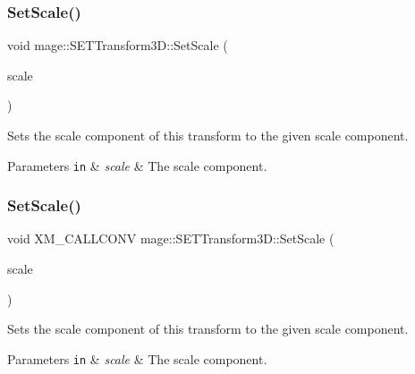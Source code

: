 \subsubsection{\texorpdfstring{Set\+Scale()}{SetScale()}\hspace{0.1cm}{\footnotesize\ttfamily [3/4]}}
{\footnotesize\ttfamily void mage\+::\+S\+E\+T\+Transform3\+D\+::\+Set\+Scale (\begin{DoxyParamCaption}\item[{\mbox{\hyperlink{namespacemage_a1e3c7a882af461f161caa1cbddaf1fa2}{F32x3}}}]{scale }\end{DoxyParamCaption})\hspace{0.3cm}{\ttfamily [noexcept]}}

Sets the scale component of this transform to the given scale component.


\begin{DoxyParams}[1]{Parameters}
\mbox{\tt in}  & {\em scale} & The scale component. \\
\hline
\end{DoxyParams}
\mbox{\label{classmage_1_1_s_e_t_transform3_d_af3d30633cdfcb5b4f8b8d4975b0009e9}} 
\subsubsection{\texorpdfstring{Set\+Scale()}{SetScale()}\hspace{0.1cm}{\footnotesize\ttfamily [4/4]}}
{\footnotesize\ttfamily void X\+M\+\_\+\+C\+A\+L\+L\+C\+O\+NV mage\+::\+S\+E\+T\+Transform3\+D\+::\+Set\+Scale (\begin{DoxyParamCaption}\item[{F\+X\+M\+V\+E\+C\+T\+OR}]{scale }\end{DoxyParamCaption})\hspace{0.3cm}{\ttfamily [noexcept]}}

Sets the scale component of this transform to the given scale component.


\begin{DoxyParams}[1]{Parameters}
\mbox{\tt in}  & {\em scale} & The scale component. \\
\hline
\end{DoxyParams}
\mbox{\label{classmage_1_1_s_e_t_transform3_d_a7ea35e6ee763b81b9669ba71baf1cc29}} 
